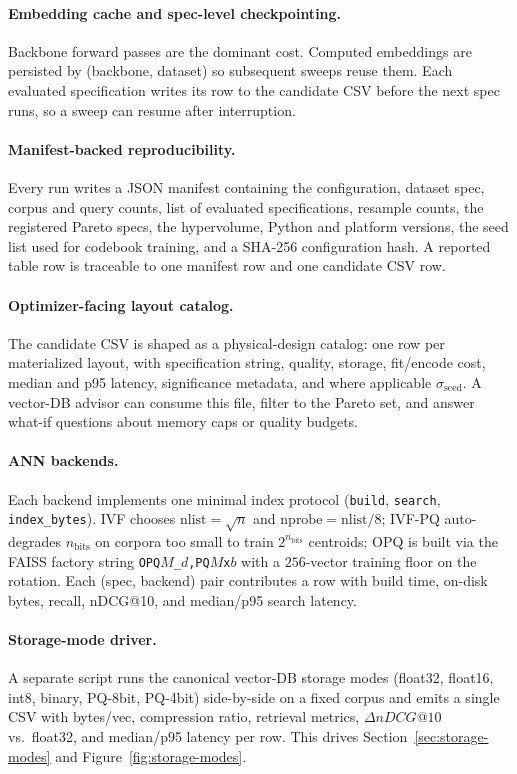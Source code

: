 \documentclass[sigconf]{acmart}
\makeatletter
\newcommand{\ndcg}{nDCG@10}
\makeatother
\begin{document}
\paragraph{Embedding cache and spec-level checkpointing.}
Backbone forward passes are the dominant cost. Computed embeddings are persisted by (backbone, dataset) so subsequent sweeps reuse them. Each evaluated specification writes its row to the candidate CSV before the next spec runs, so a sweep can resume after interruption.

\paragraph{Manifest-backed reproducibility.}
Every run writes a JSON manifest containing the configuration, dataset spec, corpus and query counts, list of evaluated specifications, resample counts, the registered Pareto specs, the hypervolume, Python and platform versions, the seed list used for codebook training, and a SHA-256 configuration hash. A reported table row is traceable to one manifest row and one candidate CSV row.

\paragraph{Optimizer-facing layout catalog.}
The candidate CSV is shaped as a physical-design catalog: one row per materialized layout, with specification string, quality, storage, fit/encode cost, median and p95 latency, significance metadata, and where applicable $\sigma_{\text{seed}}$. A vector-DB advisor can consume this file, filter to the Pareto set, and answer what-if questions about memory caps or quality budgets.

\paragraph{ANN backends.}
Each backend implements one minimal index protocol (\texttt{build}, \texttt{search}, \texttt{index\_bytes}). IVF chooses $\text{nlist}=\sqrt{n}$ and $\text{nprobe}=\text{nlist}/8$; IVF-PQ auto-degrades $n_{\text{bits}}$ on corpora too small to train $2^{n_{\text{bits}}}$ centroids; OPQ is built via the FAISS factory string \texttt{OPQ$M$\_$d$,PQ$M$x$b$} with a $256$-vector training floor on the rotation. Each (spec, backend) pair contributes a row with build time, on-disk bytes, recall, \ndcg{}, and median/p95 search latency.

\paragraph{Storage-mode driver.}
A separate script runs the canonical vector-DB storage modes (float32, float16, int8, binary, PQ-8bit, PQ-4bit) side-by-side on a fixed corpus and emits a single CSV with bytes/vec, compression ratio, retrieval metrics, $\Delta\ndcg{}$ vs.\ float32, and median/p95 latency per row. This drives Section~\ref{sec:storage-modes} and Figure~\ref{fig:storage-modes}.
\end{document}
